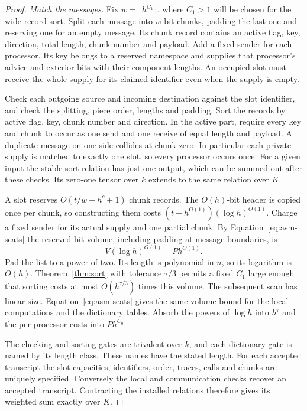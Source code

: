 \begin{proof}
\emph{Match the messages.}
Fix $w=\lceil h^{C_1}\rceil$, where $C_1>1$ will be chosen for
the wide-record sort. Split each message into $w$-bit chunks, padding
the last one and reserving one for an empty message. Its chunk record
contains an active flag, key, direction, total length, chunk number
and payload. Add a fixed sender for each processor. Its key belongs
to a reserved namespace and supplies that processor's advice and exterior bits with their
component lengths. An occupied slot must receive the whole supply
for its claimed identifier even when the supply is empty.

Check each outgoing source and incoming destination against the slot
identifier, and check the splitting, piece order, lengths and padding. Sort the
records by active flag, key, chunk number and direction. In the active
part, require every key and chunk to occur as one send and one receive
of equal length and payload. A duplicate message on one side collides
at chunk zero. In particular each private supply is matched to exactly
one slot, so every processor occurs once. For a given input the
stable-sort relation has just one output, which can be summed out after
these checks. Its zero-one tensor over $k$ extends to the same relation
over $K$.

A slot reserves $O(t/w+h^c+1)$ chunk records. The $O(h)$-bit header
is copied once per chunk, so constructing them costs
$(t+h^{O(1)})(\log h)^{O(1)}$. Charge a fixed sender for its actual
supply and one partial chunk. By Equation~\eqref{eq:asm-seats} the
reserved bit volume, including padding at message boundaries, is
\[
                     V(\log h)^{O(1)}+P h^{O(1)} .
\]
Pad the list to a power of two. Its length is polynomial in $n$, so
its logarithm is $O(h)$. Theorem~\ref{thm:sort} with tolerance
$\tau/3$ permits a fixed $C_1$ large enough that sorting costs at
most $O(h^{\tau/3})$ times this volume. The subsequent scan has
linear size. Equation~\eqref{eq:asm-seats} gives the same volume
bound for the local computations and the dictionary tables. Absorb
the powers of $\log h$ into $h^\tau$ and the per-processor costs
into $P h^{C_0}$.

The checking and sorting gates are trivalent over $k$, and each
dictionary gate is named by its length class. These names have the
stated length. For each accepted transcript the slot capacities,
identifiers, order, traces, calls and chunks are uniquely specified.
Conversely the local and communication checks recover an accepted
transcript. Contracting the installed relations therefore gives its
weighted sum exactly over $K$.
\end{proof}

